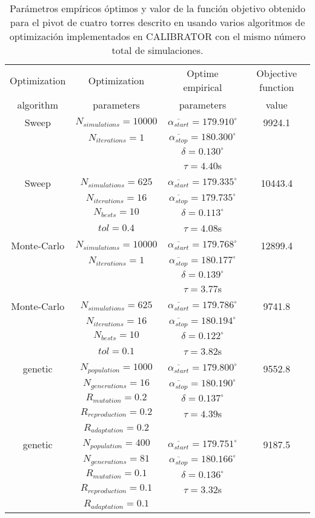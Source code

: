 \documentclass[review,authoryear]{elsarticle}
\newcommand{\TABLE}[5]
{
	\begin{table}[ht!]
		\centering
		\caption{#4.\label{#5}}
		#1
		\begin{tabular}{#2}
			#3
		\end{tabular}
	\end{table}
}
\begin{document}
\TABLE{\scriptsize}{cccc}
{
	Optimization & Optimization & Optime empirical & Objective function
	\\ algorithm & parameters & parameters & value
	\\ \hline
	Sweep & $N_{simulations}=10000$ & $\overline{\alpha_{start}}=179.910^\circ$
	& 9924.1
	\\ & $N_{iterations}=1$ & $\overline{\alpha_{stop}}=180.300^\circ$
	\\ & & $\delta=0.130^\circ$
	\\ & & $\tau=4.40$s
	\\ \hline
	Sweep & $N_{simulations}=625$ & $\overline{\alpha_{start}}=179.335^\circ$
	& 10443.4
	\\ & $N_{iterations}=16$ & $\overline{\alpha_{stop}}=179.735^\circ$
	\\ & $N_{bests}=10$ & $\delta=0.113^\circ$
	\\ & $tol=0.4$ & $\tau=4.08$s
	\\ \hline
	Monte-Carlo & $N_{simulations}=10000$
	& $\overline{\alpha_{start}}=179.768^\circ$ & 12899.4
	\\ & $N_{iterations}=1$ & $\overline{\alpha_{stop}}=180.177^\circ$
	\\ & & $\delta=0.139^\circ$
	\\ & & $\tau=3.77$s
	\\ \hline
	Monte-Carlo & $N_{simulations}=625$
	& $\overline{\alpha_{start}}=179.786^\circ$ & 9741.8
	\\ & $N_{iterations}=16$ & $\overline{\alpha_{stop}}=180.194^\circ$
	\\ & $N_{bests}=10$ & $\delta=0.122^\circ$
	\\ & $tol=0.1$ & $\tau=3.82$s
	\\ \hline
	genetic & $N_{population}=1000$ & $\overline{\alpha_{start}}=179.800^\circ$
	& 9552.8
	\\ & $N_{generations}=16$ & $\overline{\alpha_{stop}}=180.190^\circ$
	\\ & $R_{mutation}=0.2$ & $\delta=0.137^\circ$
	\\ & $R_{reproduction}=0.2$ & $\tau=4.39$s
	\\ & $R_{adaptation}=0.2$
	\\ \hline
	genetic & $N_{population}=400$ & $\overline{\alpha_{start}}=179.751^\circ$
	& 9187.5
	\\ & $N_{generations}=81$ & $\overline{\alpha_{stop}}=180.166^\circ$
	\\ & $R_{mutation}=0.1$ & $\delta=0.136^\circ$
	\\ & $R_{reproduction}=0.1$ & $\tau=3.32$s
	\\ & $R_{adaptation}=0.1$
	\\ \hline
}{Parámetros empíricos óptimos y valor de la función objetivo obtenido para el
pivot de cuatro torres descrito en \citet{Ouazaa14} usando varios algoritmos de
optimización implementados en CALIBRATOR con el mismo número total de
simulaciones}{TabPivot}
\end{document}
